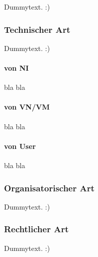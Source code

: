 Dummytext. :)


\subsubsection*{Technischer Art}
\label{subsubsec:gefahren_virt_technisch}
Dummytext. :)

\paragraph{von NI}
\label{parag:vonNI}
bla bla

\paragraph{von VN/VM}
\label{parag:vonVN}
bla bla

\paragraph{von User}
\label{parag:vonUser}
bla bla


\subsubsection*{Organisatorischer Art}
\label{subsubsec:gefahren_virt_organisatorisch}
Dummytext. :)

\subsubsection*{Rechtlicher Art}
\label{subsubsec:gefahren_virt_rechtlich}
Dummytext. :)

